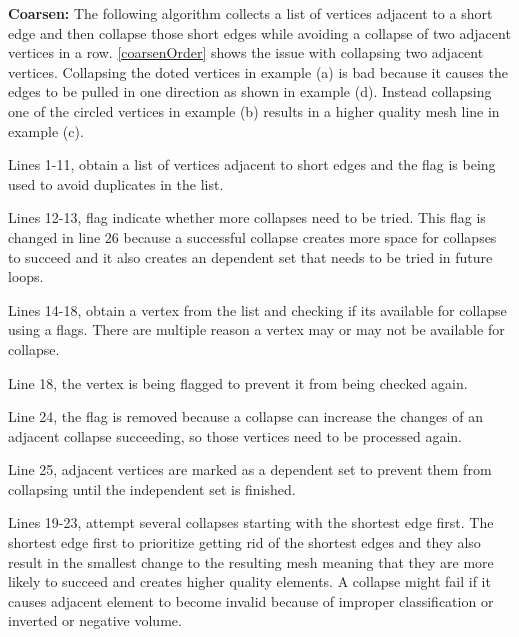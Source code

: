 \documentclass{article}
\begin{document}
\textbf{Coarsen:} The following algorithm collects a list of vertices adjacent to a short edge and then collapse those short edges while avoiding a collapse of two adjacent vertices in a row. \autoref{coarsenOrder} shows the issue with collapsing two adjacent vertices. Collapsing the doted vertices in example (a) is bad because it causes the edges to be pulled in one direction as shown in example (d). Instead collapsing one of the circled vertices in example (b) results in a higher quality mesh line in example (c).  
    
Lines 1-11, obtain a list of vertices adjacent to short edges and the flag is being used to avoid duplicates in the list.

Lines 12-13, flag indicate whether more collapses need to be tried. This flag is changed in line 26 because a successful collapse creates more space for collapses to succeed and it also creates an dependent set that needs to be tried in future loops.

Lines 14-18, obtain a vertex from the list and checking if its available for collapse using a flags. There are multiple reason a vertex may or may not be available for collapse.

Line 18, the vertex is being flagged to prevent it from being checked again.

Line 24, the flag is removed because a collapse can increase the changes of an adjacent collapse succeeding, so those vertices need to be processed again.

Line 25, adjacent vertices are marked as a dependent set to prevent them from collapsing until the independent set is finished.

Lines 19-23, attempt several collapses starting with the shortest edge first. The shortest edge first to prioritize getting rid of the shortest edges and they also result in the smallest change to the resulting mesh meaning that they are more likely to succeed and creates higher quality elements. A collapse might fail if it causes adjacent element to become invalid because of improper classification or inverted or negative volume.
\end{document}
